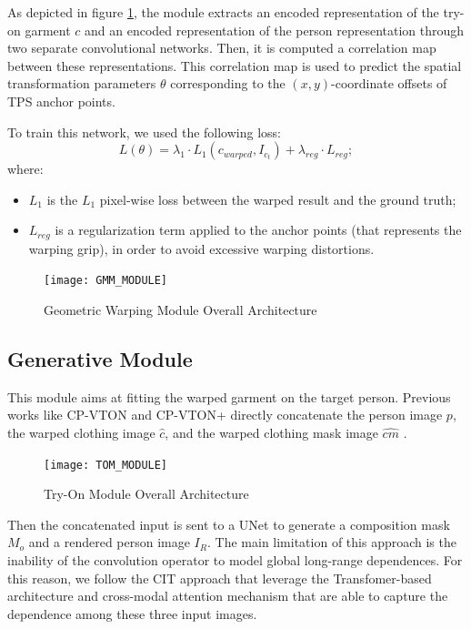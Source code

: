 As depicted in figure \ref{fig:GMM_MODULE}, the module extracts an encoded representation of the try-on garment $c$ and an encoded representation of the person representation through two separate convolutional networks.
Then, it is computed a correlation map between these representations.
This correlation map is used to predict the spatial transformation parameters $\theta$ corresponding to the $(x,y)$-coordinate offsets of TPS anchor points. 

To train this network, we used the following loss:
\begin{equation}
L(\theta) = \lambda_1 \cdot L_1(c_{warped}, I_{c_t}) + \lambda_{reg} \cdot L_{reg} ;
\end{equation} 
where:
\begin{itemize}[noitemsep]
	\item{$L_1$ is the $L_1$ pixel-wise loss between the warped result and the ground truth;} 
	\item{$L_{reg}$ is a regularization term applied to the anchor points (that represents the warping grip), in order to avoid excessive warping distortions.}
\end{itemize}
 

\begin{figure}[h]
\centering
\texttt{[image: GMM\_MODULE]}
\caption{Geometric Warping Module Overall Architecture}
\label{fig:GMM_MODULE}
\end{figure}



\subsection{Generative Module}
This module aims at fitting the warped garment on the target person. Previous works like CP-VTON and CP-VTON+ directly concatenate the person image $p$, the warped clothing image
$\hat{c}$, and the warped clothing mask image $\hat{cm}$ . 

\begin{figure}[h]
\centering
\texttt{[image: TOM\_MODULE]}
\caption{Try-On Module Overall Architecture}
\label{fig:TOM_MODULE}
\end{figure}

Then the concatenated input is sent to a UNet \cite{u-net} to generate a composition mask $M_o$ and a rendered person image $I_R$. The main limitation of this approach is the inability of the convolution operator to model global long-range dependences. For this reason, we follow the CIT \cite{CIT} approach that leverage the Transfomer-based architecture and cross-modal attention mechanism that are able to capture the dependence among these three input images.


